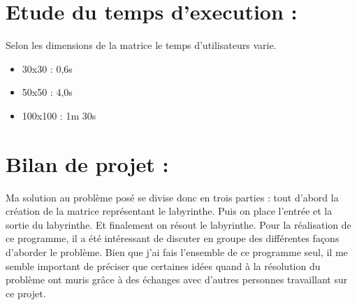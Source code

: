 \documentclass[12pt]{report}
\begin{document}
\section{Etude du temps d'execution :}
Selon les dimensions de la matrice le temps d'utilisateurs varie.
\begin{itemize}
\item 30x30 : 0,6s
\item 50x50 : 4,0s
\item 100x100 : 1m 30s
\end{itemize}

\section{Bilan de projet :}
	Ma solution au problème posé se divise donc en trois parties : tout d'abord la création de la matrice représentant le labyrinthe. Puis on place l'entrée et la sortie du labyrinthe. Et finalement on résout le labyrinthe. Pour la réalisation de ce programme, il a été intéressant de discuter en groupe des différentes façons d'aborder le problème. Bien que j'ai fais l'ensemble de ce programme seul, il me semble important de préciser que certaines idées quand à la résolution du problème ont muris grâce à des échanges avec d'autres personnes travaillant sur ce projet.
\end{document}
